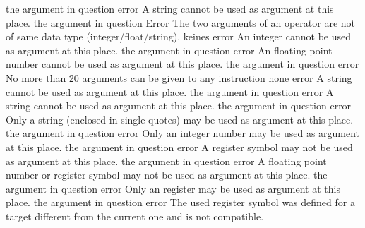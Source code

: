 \documentclass[12pt,twoside]{report}
\begin{document}
\begin{description}
               {the argument in question}
               {error}
               {A string cannot be used as argument at this place.}
               {the argument in question}
               {Error}
               {The two arguments of an operator are not of same
                data type (integer/\-float/\-string).}
               {keines}
               {error}
               {An integer cannot be used as argument at this place.}
               {the argument in question}
               {error}
               {An floating point number cannot be used as argument at this place.}
               {the argument in question}
               {error}
               {No more than 20 arguments can be given to any instruction}
               {none}
               {error}
               {A string cannot be used as argument at this place.}
               {the argument in question}
               {error}
               {A string cannot be used as argument at this place.}
               {the argument in question}
               {error}
               {Only a string (enclosed in single quotes) may be used as
                argument at this place.}
               {the argument in question}
               {error}
               {Only an integer number may be used as argument at this place.}
               {the argument in question}
               {error}
               {A register symbol may not be used as argument at this place.}
               {the argument in question}
               {error}
               {A floating point number or register symbol may not be used as argument at this place.}
               {the argument in question}
               {error}
               {Only an register may be used as argument at this place.}
               {the argument in question}
               {error}
               {The used register symbol was defined for a target different from
                the current one and is not compatible.}

\end{description}
\end{document}
